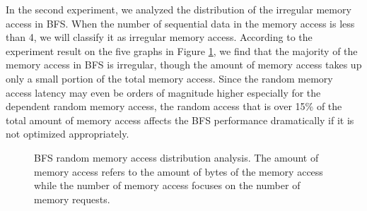 In the second experiment, we analyzed the distribution of the irregular memory access in BFS. 
When the number of sequential data in the memory access is less than 4, we will classify 
it as irregular memory access. According to the experiment result on the five graphs 
in Figure \ref{fig:bfs-mem-dist}, we find that the majority of the memory access in BFS is irregular, 
though the amount of memory access takes up only a small portion of the total memory access. 
Since the random memory access latency may even be orders of magnitude higher 
especially for the dependent random memory access, the random access that is over 15\% of 
the total amount of memory access affects the BFS performance dramatically if it is not 
optimized appropriately.
\begin{figure}
    \caption{BFS random memory access distribution analysis. The amount of memory access refers to the amount of 
	bytes of the memory access while the number of memory access focuses on the number of memory requests.}
\label{fig:bfs-mem-dist}
\vspace{-0.5em}
\end{figure}


